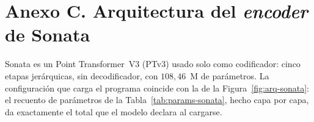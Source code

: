 
\section*{Anexo C. Arquitectura del \emph{encoder} de Sonata}
\label{sec:analisis-componentes}\label{sec:arq-sonata}

\setcounter{figure}{0}
\setcounter{table}{0}
\setcounter{equation}{0}

Sonata es un Point Transformer~V3 (PTv3) usado solo como codificador: cinco
etapas jerárquicas, sin decodificador, con $108{,}46$~M de parámetros. La
configuración que carga el programa coincide con la de la Figura~\ref{fig:arq-sonata}:
el recuento de parámetros de la Tabla~\ref{tab:params-sonata}, hecho capa por capa,
da exactamente el total que el modelo declara al cargarse.

